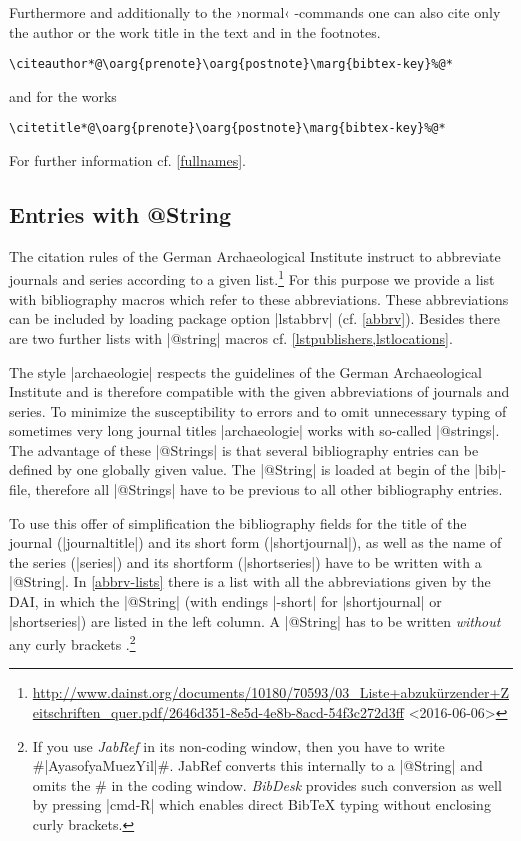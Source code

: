 \documentclass[a4paper,
10pt,
greek,
french,
spanish,
italian,
ngerman,
english
]{ltxdoc}
\begin{document}
\DescribeMacro{\citeauthor}\DescribeMacro{\citetitle}\label{citeauthor}%
Furthermore and additionally to the ›normal‹ -commands one can also cite only the author or the work title in the text and in the footnotes.
\begin{lstlisting}
\citeauthor*@\oarg{prenote}\oarg{postnote}\marg{bibtex-key}%@*
\end{lstlisting} 
  and for the works 
\begin{lstlisting}
\citetitle*@\oarg{prenote}\oarg{postnote}\marg{bibtex-key}%@*
\end{lstlisting} 
For further information cf. \cref{fullnames}.


\subsection{Entries with @String}\label{string}
The citation rules of the German Archaeological Institute instruct to abbreviate journals and series according to a given list.\footnote{\url{http://www.dainst.org/documents/10180/70593/03_Liste+abzukürzender+Zeitschriften_quer.pdf/2646d351-8e5d-4e8b-8acd-54f3c272d3ff} <2016-06-06>}
For this purpose we provide a list with bibliography macros which refer to these abbreviations. These abbreviations can be included by loading package option |lstabbrv| (cf. \cref{abbrv}). Besides there are two further lists with |@string| macros cf. \cref{lstpublishers,lstlocations}.

 The style |archaeologie| respects the guidelines of the German Archaeological Institute and is therefore compatible with the given abbreviations of journals and series.
To minimize the susceptibility to errors and to omit unnecessary typing of sometimes very long journal titles |archaeologie| works with so-called |@strings|.
The advantage of these |@Strings| is that several bibliography entries can be defined by one globally given value. 
The |@String| is loaded at begin of the |bib|-file, therefore all |@Strings| have to be previous to all other bibliography entries.
 
To use this offer of simplification the bibliography fields for the title of the journal (|journaltitle|) and its short form (|shortjournal|), as well as the name of the series (|series|) and its shortform  (|shortseries|) have to be written with a |@String|.
In \cref{abbrv-lists} there is a list with all the abbreviations given by the DAI, in which the |@String| (with endings |-short| for |shortjournal| or |shortseries|) are listed in the left column.  
A |@String| has to be written \emph{without} any curly brackets .\footnote{If you use \emph{JabRef} in its non-coding window, then you have to write \#|AyasofyaMuezYil|\#. JabRef converts this internally to a |@String| and omits the \# in the coding window. \emph{BibDesk} provides such conversion as well by pressing |cmd-R| which enables direct BibTeX typing without enclosing curly brackets.}
\end{document}
